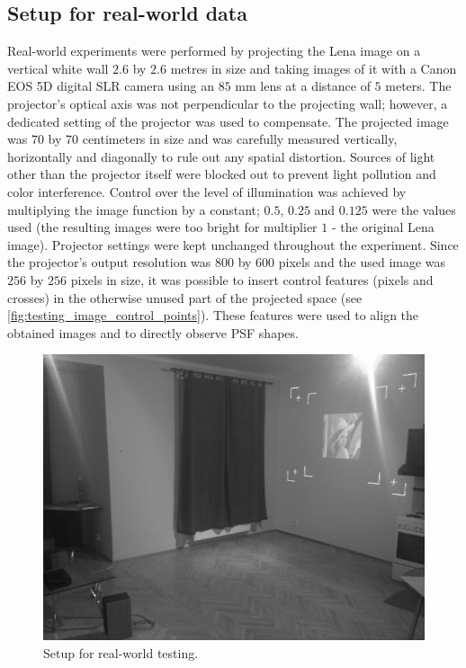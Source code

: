 \documentclass[12pt,notitlepage]{report}
\begin{document}
\subsection{Setup for real-world data}
\label{sec:setup_for_real_world_data}

Real-world experiments were performed by projecting the Lena image on a vertical white wall $2.6$ by $2.6$ metres in size and taking images of it with a Canon EOS 5D digital SLR camera using an $85$ mm lens at a distance of $5$ meters. The projector's optical axis was not perpendicular to the projecting wall; however, a dedicated setting of the projector was used to compensate. The projected image was $70$ by $70$ centimeters in size and was carefully measured vertically, horizontally and diagonally to rule out any spatial distortion.  Sources of light other than the projector itself were blocked out to prevent light pollution and color interference. Control over the level of illumination was achieved by multiplying the image function by a constant; $0.5$, $0.25$ and $0.125$ were the values used (the resulting images were too bright for multiplier $1$ - the original Lena image). Projector settings were kept unchanged throughout the experiment. Since the projector's output resolution was $800$ by $600$ pixels and the used image was $256$ by $256$ pixels in size, it was possible to insert control features (pixels and crosses) in the otherwise unused part of the projected space (see \ref{fig:testing_image_control_points}). These features were used to align the obtained images and to directly observe PSF shapes. 
\begin{figure}[htb]
 \centering
  \includegraphics[width=12cm]{testing_setup.png}
 \caption{Setup for real-world testing.}
 \label{fig:testing_setup}
\end{figure}
\end{document}
